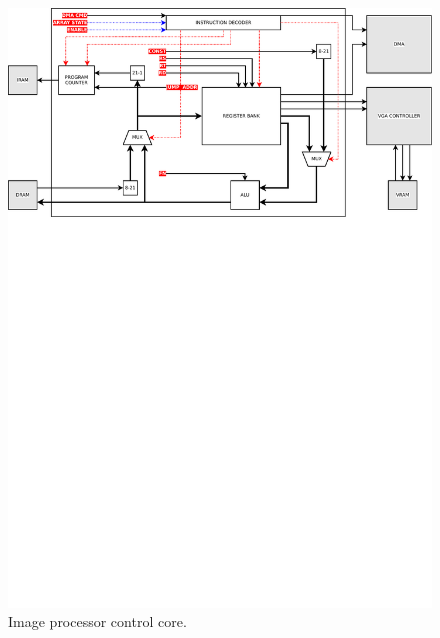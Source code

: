 \begin{figure}[h]
  \begin{addmargin}{-2cm}
    \centering
    \includegraphics[width=\linewidth,clip,trim=0 18cm 0 0]
                    {fig/fpga/fpga_ctrl_core.pdf}
    \caption{Image processor control core.}
    \label{fig:fpga-ctrl-core}
  \end{addmargin}
\end{figure}
